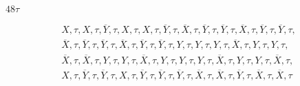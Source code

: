 \noindent $48\tau$

\begin{equation*}
\begin{aligned}
    X, \tau, X, \tau, \overline{Y}, \tau, X, \tau, X, \tau, \overline{Y}, \tau, \overline{X}, \tau, \overline{Y}, \tau, \overline{Y}, \tau, \overline{X}, \tau, \overline{Y}, \tau, \overline{Y}, \tau, \\
    \overline{X}, \tau, \overline{Y}, \tau, \overline{Y}, \tau, \overline{X}, \tau, \overline{Y}, \tau, \overline{Y}, \tau, Y, \tau, Y, \tau, Y, \tau, \overline{X}, \tau, Y, \tau, Y, \tau,\\
    \overline{X}, \tau, \overline{X}, \tau, Y, \tau, Y, \tau, \overline{X}, \tau, Y, \tau, Y, \tau, Y, \tau, \overline{X}, \tau, Y, \tau, Y, \tau, \overline{X}, \tau,\\
    X, \tau, \overline{Y}, \tau, \overline{Y}, \tau, X, \tau, \overline{Y}, \tau, \overline{Y}, \tau, \overline{Y}, \tau, \overline{X}, \tau, \overline{X}, \tau, \overline{Y}, \tau, \overline{X}, \tau, \overline{X}, \tau\\
\end{aligned}
\end{equation*}
